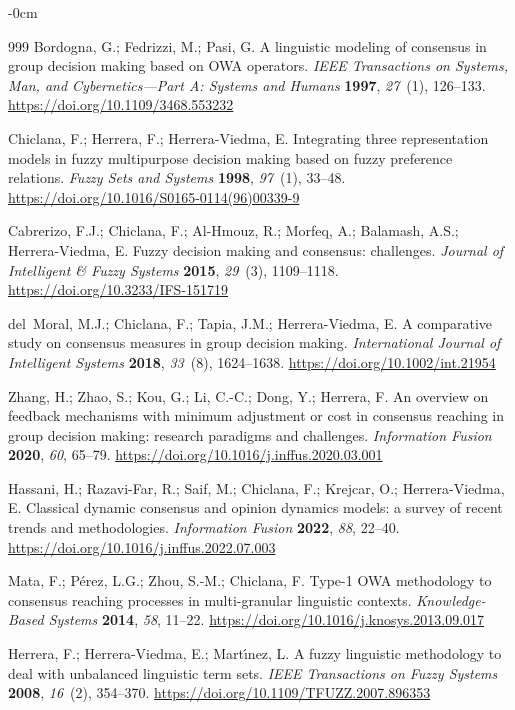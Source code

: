 \documentclass[smartcities,article,submit,moreauthors]{Definitions/mdpi}
\begin{document}
\begin{adjustwidth}{-\extralength}{0cm}
\begin{thebibliography}{999}
Bordogna, G.; Fedrizzi, M.; Pasi, G. A linguistic modeling of consensus in
group decision making based on OWA operators. \emph{IEEE Transactions on
Systems, Man, and Cybernetics---Part A: Systems and Humans} \textbf{1997},
\emph{27}~(1), 126--133.
\url{https://doi.org/10.1109/3468.553232}

Chiclana, F.; Herrera, F.; Herrera-Viedma, E. Integrating three representation
models in fuzzy multipurpose decision making based on fuzzy preference
relations. \emph{Fuzzy Sets and Systems} \textbf{1998}, \emph{97}~(1), 33--48.
\url{https://doi.org/10.1016/S0165-0114(96)00339-9}

Cabrerizo, F.J.; Chiclana, F.; Al-Hmouz, R.; Morfeq, A.; Balamash, A.S.;
Herrera-Viedma, E. Fuzzy decision making and consensus: challenges.
\emph{Journal of Intelligent \& Fuzzy Systems} \textbf{2015}, \emph{29}~(3),
1109--1118.
\url{https://doi.org/10.3233/IFS-151719}

del~Moral, M.J.; Chiclana, F.; Tapia, J.M.; Herrera-Viedma, E. A comparative
study on consensus measures in group decision making. \emph{International
Journal of Intelligent Systems} \textbf{2018}, \emph{33}~(8), 1624--1638.
\url{https://doi.org/10.1002/int.21954}

Zhang, H.; Zhao, S.; Kou, G.; Li, C.-C.; Dong, Y.; Herrera, F. An overview on
feedback mechanisms with minimum adjustment or cost in consensus reaching in
group decision making: research paradigms and challenges. \emph{Information
Fusion} \textbf{2020}, \emph{60}, 65--79.
\url{https://doi.org/10.1016/j.inffus.2020.03.001}

Hassani, H.; Razavi-Far, R.; Saif, M.; Chiclana, F.; Krejcar, O.;
Herrera-Viedma, E. Classical dynamic consensus and opinion dynamics models: a
survey of recent trends and methodologies. \emph{Information Fusion}
\textbf{2022}, \emph{88}, 22--40.
\url{https://doi.org/10.1016/j.inffus.2022.07.003}

Mata, F.; P\'erez, L.G.; Zhou, S.-M.; Chiclana, F. Type-1 OWA methodology to
consensus reaching processes in multi-granular linguistic contexts.
\emph{Knowledge-Based Systems} \textbf{2014}, \emph{58}, 11--22.
\url{https://doi.org/10.1016/j.knosys.2013.09.017}

Herrera, F.; Herrera-Viedma, E.; Mart\'\i nez, L. A fuzzy linguistic
methodology to deal with unbalanced linguistic term sets. \emph{IEEE
Transactions on Fuzzy Systems} \textbf{2008}, \emph{16}~(2), 354--370.
\url{https://doi.org/10.1109/TFUZZ.2007.896353}


\end{thebibliography}
\end{adjustwidth}
\end{document}
